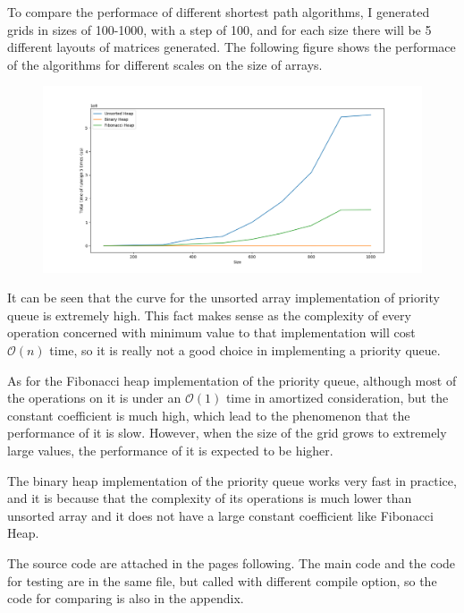 \documentclass{article}
\begin{document}
To compare the performace of different shortest path algorithms, I generated grids in sizes of 100-1000, with a step of 100, and for each size there will be 5 different layouts of matrices generated. The following figure shows the performace of the algorithms for different scales on the size of arrays.

\begin{figure}[htbp]
        \centering
        \includegraphics[scale=0.5]{1.png}
\end{figure}

It can be seen that the curve for the unsorted array implementation of priority queue is extremely high. This fact makes sense as the complexity of every operation concerned with minimum value to that implementation will cost $\mathcal{O}(n)$ time, so it is really not a good choice in implementing a priority queue.

As for the Fibonacci heap implementation of the priority queue, although most of the operations on it is under an $\mathcal{O}(1)$ time in amortized consideration, but the constant coefficient is much high, which lead to the phenomenon that the performance of it is slow. However, when the size of the grid grows to extremely large values, the performance of it is expected to be higher.

The binary heap implementation of the priority queue works very fast in practice, and it is because that the complexity of its operations is much lower than unsorted array and it does not have a large constant coefficient like Fibonacci Heap.

The source code are attached in the pages following. The main code and the code for testing are in the same file, but called with different compile option, so the code for comparing is also in the appendix.

\newpage
\end{document}

